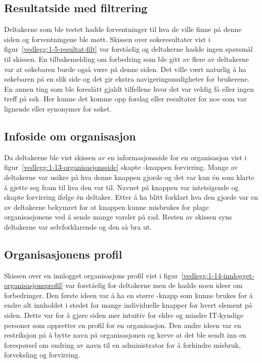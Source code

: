 \subsection{Resultatside med filtrering}

Deltakerne som ble testet hadde forventninger til hva de ville finne på denne siden og forventningene ble møtt. 
Skissen over søkeresultater vist i figur~\ref{vedlegg:1-5-resultat-filt} var forståelig og deltakerne hadde ingen spørsmål til skissen.
En tilbakemelding om forbedring som ble gitt av flere av deltakerne var at søkebaren burde også være på denne siden. Det ville vært naturlig å ha søkebaren på en slik side og det gir ekstra navigeringsmuligheter for brukerene. En annen ting som ble foreslått gjaldt tilfellene hvor det var veldig få eller ingen treff på søk. Her kunne det komme opp forslag eller resultater for noe som var lignende eller synonymer for søket.


\subsection{Infoside om organisasjon}

Da deltakerne ble vist skissen av en informasjonsside for en organisasjon vist i figur~\ref{vedlegg:1-13-organisasjonsside} skapte -knappen forvirring. Mange av deltakerne var usikre på hva denne knappen gjorde og det var kun én som klarte å gjette seg fram til hva den var til. Navnet på knappen var intetsigende og skapte forvirring ifølge én deltaker. Etter å ha blitt forklart hva den gjorde var en av deltakerne bekymret for at knappen kunne misbrukes for plage organisasjonene ved å sende mange varsler på rad. Resten av skissen syns deltakerne var selvforklarende og den så bra ut. 


\subsection{Organisasjonens profil}

Skissen over en innlogget organisasjons profil vist i figur~\ref{vedlegg:1-14-innlogget-organisasjonsprofil} var forståelig for deltakerne men de hadde noen ideer om forbedringer. Den første ideen var å ha en større -knapp som kunne brukes for å endre alt innholdet i stedet for mange individuelle knapper for hvert element på siden. Dette var for å gjøre siden mer intuitiv for eldre og mindre IT-kyndige personer som oppretter en profil for en  organisasjon. Den andre ideen var en restriksjon på å bytte navn på organisasjonen og kreve at det ble sendt inn en forespørsel om endring av navn til en administrator for å forhindre misbruk, forveksling og forvirring.

